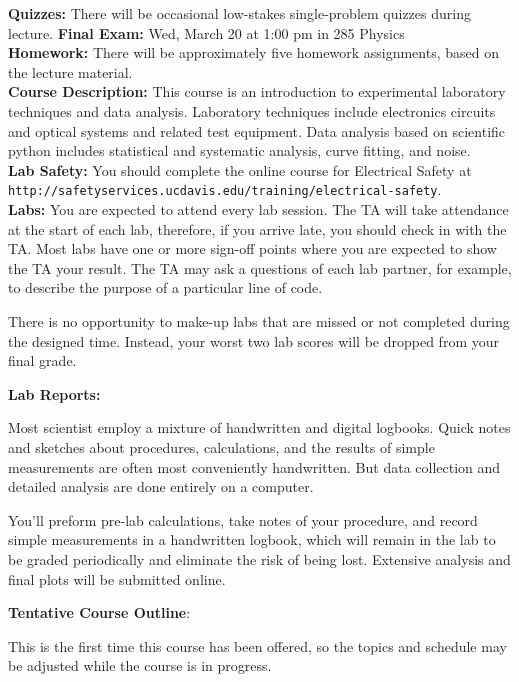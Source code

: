 \documentclass[12pt]{article}
\begin{document}
\noindent
\textbf{Quizzes:}  There will be occasional low-stakes single-problem quizzes during lecture.
\textbf{Final Exam:} Wed, March 20 at 1:00 pm in 285 Physics \\
\textbf{Homework:}  There will be approximately five homework assignments, based on the lecture material.\\

\noindent
\textbf {Course Description:}  This course is an introduction to experimental laboratory techniques and data analysis.  Laboratory techniques include electronics circuits and optical systems and related test equipment.  Data analysis based on scientific python includes statistical and systematic analysis, curve fitting, and noise.\\

\noindent
\textbf {Lab Safety:} 
You should complete the online course for Electrical Safety at \\
{\tt http://safetyservices.ucdavis.edu/training/electrical-safety}.\\


\noindent
\textbf {Labs:} 
You are expected to attend every lab session.  The TA will take attendance at the start of each lab, therefore, if you arrive late, you should check in with the TA.   Most labs have one or more sign-off points where you are expected to show the TA your result.  The TA may ask a questions of each lab partner, for example, to describe the purpose of a particular line of code.

There is no opportunity to make-up labs that are missed or not completed during the designed time.  Instead, your worst two lab scores will be dropped from your final grade.  

\noindent
\textbf {Lab Reports:} 

Most scientist employ a mixture of handwritten and digital logbooks.  Quick notes and sketches about procedures, calculations, and the results of simple measurements are often most conveniently handwritten.  But data collection and detailed analysis are done entirely on a computer.

You'll preform pre-lab calculations, take notes of your procedure, and record simple measurements in a handwritten logbook, which will remain in the lab to be graded periodically and eliminate the risk of being lost.  Extensive analysis and final plots will be submitted online.

\vskip 0.5cm
\noindent
\textbf {Tentative Course Outline}:

This is the first time this course has been offered, so the topics and schedule may be adjusted while the course is in progress.
\end{document}

